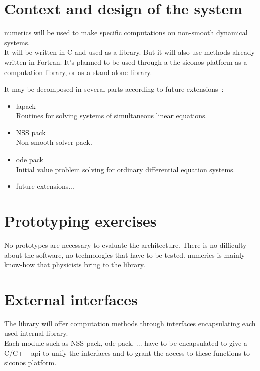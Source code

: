 \section{Context and design of the system}
\ac{numerics} will be used to make specific computations on non-smooth dynamical systems.\\

It will be written in C and used as a library. But it will also use methods already written in Fortran.
It's planned to be used through a the \ac{siconos} platform as a computation library, or as a stand-alone library.

It may be decomposed in several parts according to future extensions~:
  \begin{itemize}
  	\item \ac{lapack}\\
		Routines for solving systems of simultaneous linear equations.
    \item NSS pack\\
		Non smooth solver pack.
    \item \ac{ode} pack\\
		Initial value problem solving for ordinary differential equation systems.
	\item future extensions...\\
  \end{itemize}
  
  

\section{Prototyping exercises}
No prototypes are necessary to evaluate the architecture. There is no difficulty about the software, no technologies that have to be tested. \ac{numerics} is mainly know-how that physicists bring to the library.


\section{External interfaces}
The library will offer computation methods through interfaces encapsulating each used internal library.\\
Each module such as NSS pack, \ac{ode} pack, ... have to be encapsulated to give a C/C++ \ac{api} to unify the interfaces and to grant the access to these functions to \ac{siconos} platform.
